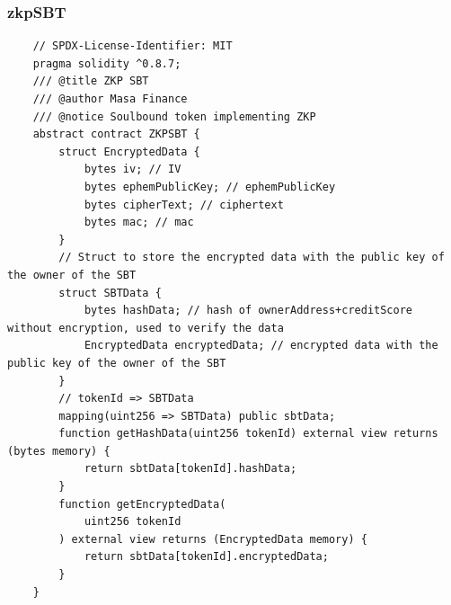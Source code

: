 \documentclass{article}
\begin{document}
  \subsubsection{zkpSBT}

  \begin{verbatim}
    // SPDX-License-Identifier: MIT
    pragma solidity ^0.8.7;
    /// @title ZKP SBT
    /// @author Masa Finance
    /// @notice Soulbound token implementing ZKP
    abstract contract ZKPSBT {
        struct EncryptedData {
            bytes iv; // IV
            bytes ephemPublicKey; // ephemPublicKey
            bytes cipherText; // ciphertext
            bytes mac; // mac
        }
        // Struct to store the encrypted data with the public key of the owner of the SBT
        struct SBTData {
            bytes hashData; // hash of ownerAddress+creditScore without encryption, used to verify the data
            EncryptedData encryptedData; // encrypted data with the public key of the owner of the SBT
        }
        // tokenId => SBTData
        mapping(uint256 => SBTData) public sbtData;
        function getHashData(uint256 tokenId) external view returns (bytes memory) {
            return sbtData[tokenId].hashData;
        }
        function getEncryptedData(
            uint256 tokenId
        ) external view returns (EncryptedData memory) {
            return sbtData[tokenId].encryptedData;
        }
    }
    \end{verbatim}
\end{document}
